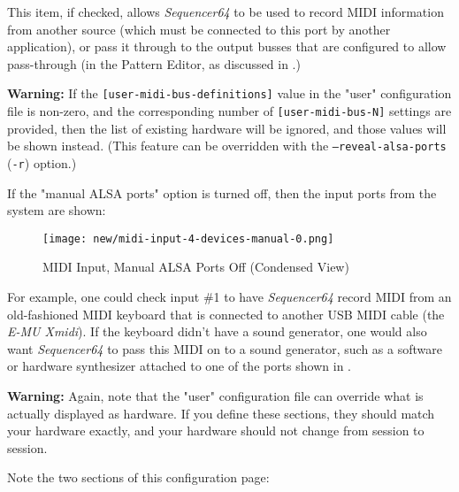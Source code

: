    This item, if checked, allows \textsl{Sequencer64} to be used to record MIDI
   information from another source (which must be connected to this port by
   another application), or pass it through to the output busses
   that are configured to allow pass-through
   (in the Pattern Editor, as discussed in 
   .)

   \textbf{Warning:}
   If the 
   \texttt{[user-midi-bus-definitions]} value in the "user" configuration file
   is non-zero, and the
   corresponding number of
   \texttt{[user-midi-bus-N]} settings are provided, then
   the list of existing hardware will be ignored, and those values will be
   shown instead.
   (This feature can be overridden with the
   \texttt{--reveal-alsa-ports} (\texttt{-r}) option.)


   If the "manual ALSA ports" option is turned off, then
   the input ports from the system are shown:

\begin{figure}[H]
   \centering 
   \texttt{[image: new/midi-input-4-devices-manual-0.png]}
   \caption{MIDI Input, Manual ALSA Ports Off (Condensed View)}
   \label{fig:seq64_midi_input_4_devices_manual_0}
\end{figure}

   For example, one could check input \#1 to have \textsl{Sequencer64} record
   MIDI from an old-fashioned MIDI keyboard that is connected to another
   USB MIDI cable (the \textsl{E-MU Xmidi}).  If the keyboard didn't have a
   sound generator, one would also want \textsl{Sequencer64} to pass this MIDI
   on to a sound generator, such as a software or hardware synthesizer attached
   to one of the ports shown in
   .

   \textbf{Warning:}
   Again, note that the "user" configuration file can override what is actually
   displayed as hardware.  If you define these sections, they should match your
   hardware exactly, and your hardware should not change from session to
   session.

   Note the two sections of this configuration page:

